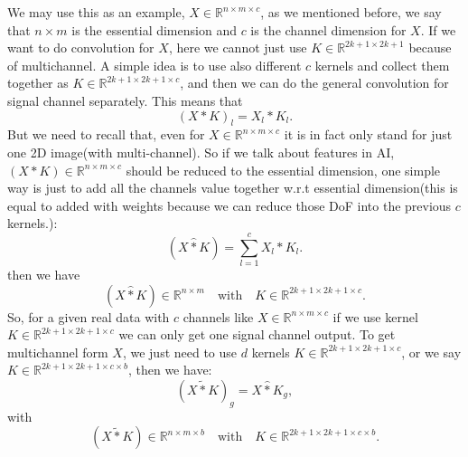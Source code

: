 We may use this as an example, $X \in \mathbb{R}^{n\times m \times c}$, as we mentioned before, we say that $n \times m$ is the essential dimension and $c$ is the channel dimension for $X$. If we want to do convolution for $X$, here we cannot just use $K \in \mathbb{R}^{2k+1 \times 2k+1}$ because of multichannel. A simple idea is to use also different $c$ kernels and collect them together as $K \in \mathbb{R}^{2k+1 \times 2k+1 \times c}$, and then we can do the general convolution for signal channel separately. This means that 
\begin{equation}
(X \ast K)_{l} = X_{l}\ast K_{l}.
\end{equation}
But we need to recall that, even for $X \in \mathbb{R}^{n\times m \times c}$ it is in fact only stand for just one 2D image(with multi-channel). So if we talk about features in AI, $(X\ast K) \in \mathbb{R}^{n\times m \times c}$ should be reduced to the essential dimension, one simple way is just to add all the channels value together w.r.t essential dimension(this is equal to added with weights because we can reduce those DoF into the previous $c$ kernels.):
\begin{equation}
(X \hat{\ast} K) = \sum_{l=1}^{c} X_{l}\ast K_{l}. 
\end{equation}
then we have
\begin{equation}
(X \hat{\ast} K) \in \mathbb{R}^{n \times m} \quad \text{with} \quad K \in \mathbb{R}^{2k+1 \times 2k+1 \times c}.
\end{equation}
So, for a given real data with $c$ channels like $X \in  \mathbb{R}^{n\times m \times c}$ if we use kernel $K \in \mathbb{R}^{2k+1 \times 2k+1 \times c}$ we can only get one signal channel output. To get multichannel form $X$, we just need to use $d$ kernels $K \in \mathbb{R}^{2k+1 \times 2k+1 \times c}$, or we say $K \in \mathbb{R}^{2k+1 \times 2k+1 \times c \times b}$, then we have:
\begin{equation}\label{6.6}
(X \tilde{\ast} K)_{g} =  X \hat{\ast} K_{g},
\end{equation}
with 
\begin{equation}
(X \tilde{\ast} K) \in \mathbb{R}^{n \times m \times b} \quad \text{with} \quad K \in \mathbb{R}^{2k+1 \times 2k+1 \times c \times b}.
\end{equation}

